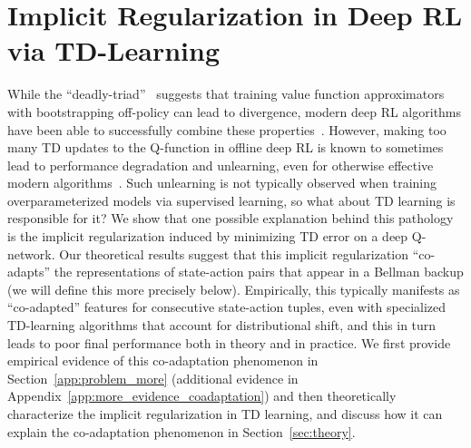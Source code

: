 \vspace{-0.3cm}
\section{Implicit Regularization in Deep RL via TD-Learning}
\vspace{-0.3cm}
\label{sec:problem}
While the ``deadly-triad''~\citep{suttonrlbook} suggests that training value function approximators with bootstrapping off-policy can lead to divergence, modern deep RL algorithms have been able to successfully combine these properties~\citep{Hasselt2018DeepRL}. However, making too many TD updates to the Q-function in offline deep RL is known to sometimes lead to performance degradation and unlearning, even for otherwise effective modern algorithms~\citep{fu2019diagnosing, fedus2020revisiting,agarwal2019optimistic,kumar2021implicit}. Such unlearning is not typically observed when training overparameterized models via supervised learning, so what about TD learning is responsible for it? We show that one possible explanation behind this pathology is the implicit regularization induced by minimizing TD error on a deep Q-network. Our theoretical results suggest that this implicit regularization ``co-adapts'' the representations of state-action pairs that appear in a Bellman backup (we will define this more precisely below).
Empirically, this typically manifests as ``co-adapted'' features for consecutive state-action tuples, even with specialized TD-learning algorithms that account for distributional shift, and this in turn leads to poor final performance both in theory and in practice. We first provide empirical evidence of this co-adaptation phenomenon in Section~\ref{app:problem_more} (additional evidence in Appendix~\ref{app:more_evidence_coadaptation}) and then theoretically characterize the implicit regularization in TD learning, and discuss how it can explain the co-adaptation phenomenon in Section~\ref{sec:theory}.

